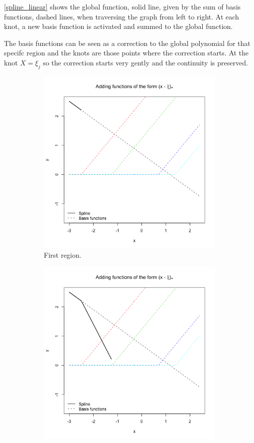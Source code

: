 \documentclass[12pt, letterpaper]{article}
\theoremstyle{definition}
\begin{document}
\ref{spline_linear} shows the global function, solid line, given by the sum of basis functions, dashed lines, when traversing the graph from left to right. At each knot, a new basis function is activated and summed to the global function.

The basis functions can be seen as a correction to the global polynomial for that  specifc region and the knots are those points where the correction starts. At the knot $X=\xi_j$ so the correction starts very gently and the continuity is preserved.

\begin{figure}
\begin{subfigure}{0.49\textwidth}
\centering
\includegraphics[width=0.9\linewidth]{img/spline_linear/10}
\caption{First region.}
\end{subfigure}
\hfill
\begin{subfigure}{0.49\textwidth}
\centering
\includegraphics[width=0.9\linewidth]{img/spline_linear/33}

\end{subfigure}
\end{figure}
\end{document}
